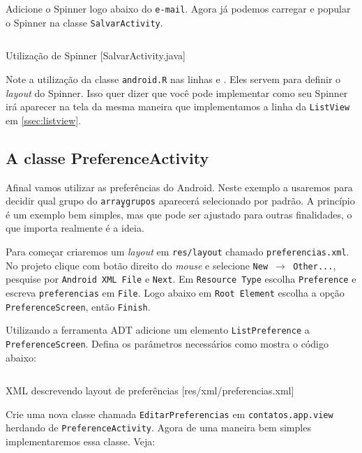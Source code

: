 Adicione o Spinner logo abaixo do \texttt{e-mail}. Agora já podemos carregar e popular o Spinner
na classe \texttt{SalvarActivity}.

\begin{listing}[H]
  \inputminted[linenos=true,frame=bottomline,tabsize=3]{ java }{ source/SalvarActivity-6.java }
  \caption{Utilização de Spinner [SalvarActivity.java]}
\end{listing}

Note a utilização da classe \texttt{android.R} nas linhas  e . Eles servem
para definir o \textit{layout} do Spinner. Isso quer dizer que você pode implementar como seu Spinner
irá aparecer na tela da mesma maneira que implementamos a linha da \texttt{ListView} em \ref{ssec:listview}.

\subsection{A classe PreferenceActivity}

Afinal vamos utilizar as preferências do Android. Neste exemplo a usaremos para decidir qual grupo
do \texttt{array\b{ }grupos} aparecerá selecionado por padrão. A princípio é um exemplo bem simples, mas
que pode ser ajustado para outras finalidades, o que importa realmente é a ideia.

Para começar criaremos um \textit{layout} em \texttt{res/layout} chamado \texttt{preferencias.xml}.
No projeto clique com botão direito do \textit{mouse} e selecione \texttt{New $\rightarrow$ Other...},
pesquise por \texttt{Android XML File} e \texttt{Next}. Em \texttt{Resource Type} escolha
\texttt{Preference} e escreva \texttt{preferencias} em \texttt{File}. Logo abaixo em \texttt{Root Element}
escolha a opção \texttt{PreferenceScreen}, então \texttt{Finish}.

Utilizando a ferramenta ADT adicione um elemento \texttt{ListPreference} a \texttt{PreferenceScreen}.
Defina os parâmetros necessários como mostra o código abaixo:

\begin{listing}[H]
  \inputminted[linenos=true,frame=bottomline,tabsize=3]{ xml }{ source/preferencias-1.xml }
  \caption{XML descrevendo layout de preferências [res/xml/preferencias.xml]}
\end{listing}

Crie uma nova classe chamada \texttt{EditarPreferencias} em \texttt{contatos.app.view} herdando de
\texttt{PreferenceActivity}. Agora de uma maneira bem simples implementaremos essa classe. Veja:

